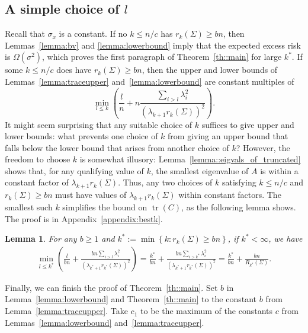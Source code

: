 \documentclass[11pt,notitlepage]{article}
\newcommand\tr {\ensuremath{\operatorname{\mathrm{tr}}}}
\newtheorem{lemma}[theorem]{Lemma}
\begin{document}
\subsection*{A simple choice of $l$}

Recall that $\sigma_x$ is a constant. 
If no $k\le n/c$ has $r_k(\Sigma)\ge bn$,
then Lemmas~\ref{lemma:bv} and \ref{lemma:lowerbound}
imply that the expected excess risk is $\Omega(\sigma^2)$,
which proves the first paragraph of Theorem~\ref{th::main} for large
$k^*$.
If some $k\le n/c$ does have $r_k(\Sigma)\ge bn$, then the upper and lower
bounds of Lemmas~\ref{lemma:traceupper} and~\ref{lemma:lowerbound} are
constant multiples of
  \[
    \min_{l\le k} \left(
      \frac{l}{n} + n\frac{\sum_{i>l}\lambda_i^2}
      {\left(\lambda_{k+1}r_k(\Sigma)\right)^2}\right).
  \]
It might seem surprising that any suitable choice of $k$ suffices
to give upper and lower bounds: what prevents one choice of $k$
from giving an upper bound that falls below the lower bound that
arises from another choice of $k$? However, the freedom to choose
$k$ is somewhat illusory: Lemma~\ref{lemma::eigvals_of_truncated}
shows that, for any qualifying value of $k$, the smallest eigenvalue
of $A$ is within a constant factor of $\lambda_{k+1}r_k(\Sigma)$.
Thus, any two choices of $k$ satisfying $k\le n/c$ and $r_k(\Sigma)\ge
bn$ must have values of $\lambda_{k+1}r_k(\Sigma)$ within constant
factors.  The smallest such $k$ simplifies the bound on $\tr(C)$, as
the following lemma shows. The proof is in Appendix~\ref{appendix:bestk}.

\begin{lemma}\label{lemma:bestk}
For any $b\ge 1$ and $k^* := \min\left\{k: r_k(\Sigma)\ge bn\right\}$,
if $k^* < \infty$, we have
  \begin{align*}
    \min_{l\le k^*} \left(
      \frac{l}{bn} + \frac{bn\sum_{i>l}\lambda_i^2}
      {\left(\lambda_{k^*+1}r_{k^*}(\Sigma)\right)^2}\right)
    = \frac{k^*}{bn} + \frac{bn\sum_{i>k^*}\lambda_i^2}
      {\left(\lambda_{k^*+1}r_{k^*}(\Sigma)\right)^2}
    = \frac{k^*}{bn} + \frac{bn}{R_{k^*}(\Sigma)}.
  \end{align*}
\end{lemma}

Finally, we can finish the proof of Theorem~\ref{th::main}. 
Set $b$ in Lemma~\ref{lemma:lowerbound} and Theorem~\ref{th::main} to the constant $b$ from  Lemma~\ref{lemma:traceupper}. Take $c_1$ to be the maximum of the constants $c$ from  Lemmas~\ref{lemma:lowerbound} and~\ref{lemma:traceupper}.
\end{document}
